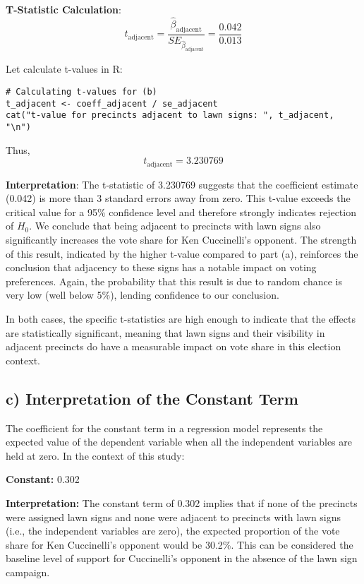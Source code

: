 \documentclass[12pt]{article}
\begin{document}
\textbf{T-Statistic Calculation}:
\[ t_{\text{adjacent}} = \frac{\hat{\beta}_{\text{adjacent}}}{SE_{\hat{\beta}_{\text{adjacent}}}} = \frac{0.042}{0.013} \]

Let calculate t-values in R:
\begin{lstlisting}
# Calculating t-values for (b)
t_adjacent <- coeff_adjacent / se_adjacent
cat("t-value for precincts adjacent to lawn signs: ", t_adjacent, "\n")
\end{lstlisting}

Thus,\[ t_{\text{adjacent}} = 3.230769 \]

\textbf{Interpretation}: The t-statistic of 3.230769 suggests that the coefficient estimate (0.042) is more than 3 standard errors away from zero. This t-value exceeds the critical value for a 95\% confidence level and therefore strongly indicates rejection of \( H_0 \). We conclude that being adjacent to precincts with lawn signs also significantly increases the vote share for Ken Cuccinelli's opponent. The strength of this result, indicated by the higher t-value compared to part (a), reinforces the conclusion that adjacency to these signs has a notable impact on voting preferences. Again, the probability that this result is due to random chance is very low (well below 5\%), lending confidence to our conclusion.

In both cases, the specific t-statistics are high enough to indicate that the effects are statistically significant, meaning that lawn signs and their visibility in adjacent precincts do have a measurable impact on vote share in this election context.

\subsection*{c) Interpretation of the Constant Term}

The coefficient for the constant term in a regression model represents the expected value of the dependent variable when all the independent variables are held at zero. In the context of this study:

\textbf{Constant:} 0.302


\textbf{Interpretation: }The constant term of 0.302 implies that if none of the precincts were assigned lawn signs and none were adjacent to precincts with lawn signs (i.e., the independent variables are zero), the expected proportion of the vote share for Ken Cuccinelli's opponent would be 30.2\%. This can be considered the baseline level of support for Cuccinelli's opponent in the absence of the lawn sign campaign.
\end{document}
